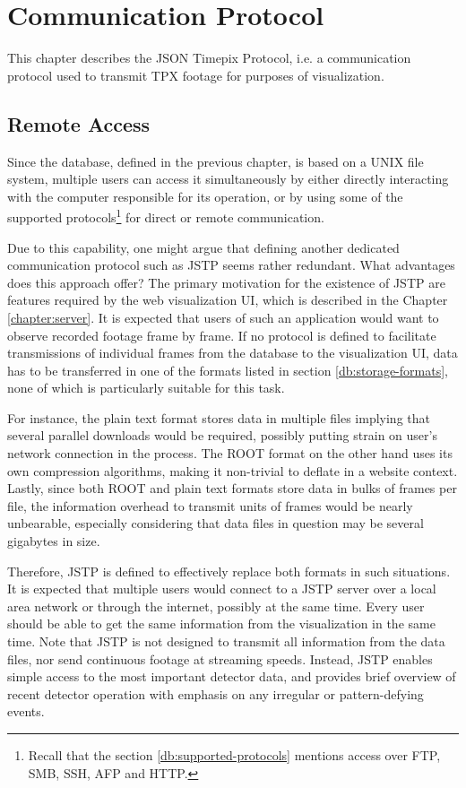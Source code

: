 \chapter{Communication Protocol}
\label{protocol:introduction}
This chapter describes the JSON Timepix Protocol, i.e. a communication protocol used to transmit TPX footage for purposes of visualization.

\section{Remote Access}
Since the database, defined in the previous chapter, is based on a UNIX file system, multiple users can access it simultaneously by either directly interacting with the computer responsible for its operation, or by using some of the supported protocols\footnote{Recall that the section \ref{db:supported-protocols} mentions access over FTP, SMB, SSH, AFP and HTTP.} for direct or remote communication.

Due to this capability, one might argue that defining another dedicated communication protocol such as JSTP seems rather redundant. What advantages does this approach offer? The primary motivation for the existence of JSTP are features required by the web visualization UI, which is described in the Chapter \ref{chapter:server}. It is expected that users of such an application would want to observe recorded footage frame by frame. If no protocol is defined to facilitate transmissions of individual frames from the database to the visualization UI, data has to be transferred in one of the formats listed in section \ref{db:storage-formats}, none of which is particularly suitable for this task.

For instance, the plain text format stores data in multiple files implying that several parallel downloads would be required, possibly putting strain on user's network connection in the process. The ROOT format on the other hand uses its own compression algorithms, making it non-trivial to deflate in a website context. Lastly, since both ROOT and plain text formats store data in bulks of frames per file, the information overhead to transmit units of frames would be nearly unbearable, especially considering that data files in question may be several gigabytes in size.

Therefore, JSTP is defined to effectively replace both formats in such situations. It is expected that multiple users would connect to a JSTP server over a local area network or through the internet, possibly at the same time. Every user should be able to get the same information from the visualization in the same time. Note that JSTP is not designed to transmit all information from the data files, nor send continuous footage at streaming speeds. Instead, JSTP enables simple access to the most important detector data, and provides brief overview of recent detector operation with emphasis on any irregular or pattern-defying events.

